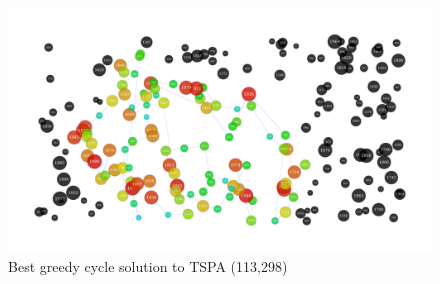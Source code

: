 \documentclass[14pt]{article}
\begin{document}
\begin{figure}[H]
	\begin{adjustwidth}{-3em}{0}
		\includegraphics{results/best_greedy-cycle_TSPA.pdf}
	\end{adjustwidth}
	\vspace{-15mm}
	\caption{Best greedy cycle solution to TSPA (113,298)}
\end{figure}
\end{document}
